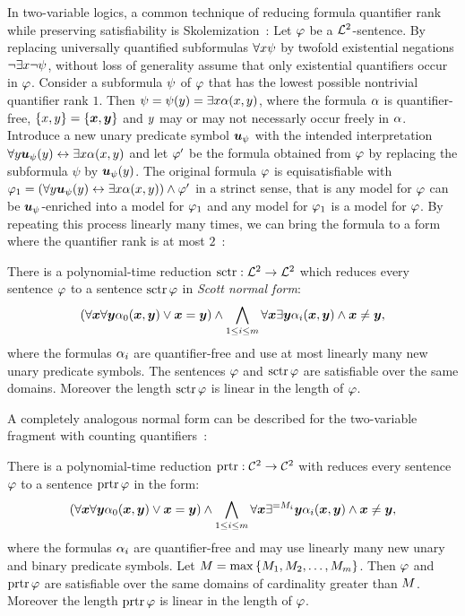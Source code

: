 In two-variable logics, a common technique of reducing formula quantifier rank
while preserving satisfiability is Skolemization~\cite{gradel1999logics}:
Let $\varphi$ be a $\mathcal{L}^{2}$-sentence.
By replacing universally quantified subformulas $\forall x \psi$ by twofold
existential negations $\lnot\exists x \lnot\psi$, without loss of generality
assume that only existential quantifiers occur in $\varphi$.
Consider a subformula $\psi$ of $\varphi$ that has the lowest possible nontrivial
quantifier rank $1$.
Then $\psi = \psi(y) = \exists x \alpha(x,y)$, where the formula
$\alpha$ is quantifier-free, $\left\{x,y\right\} = \left\{\bm{x},\bm{y}\right\}$ and $y$ may
or may not necessarly occur freely in $\alpha$.
Introduce a new unary predicate symbol $\bm{u}_{\psi}$ with the intended
interpretation $\forall y \bm{u}_{\psi}(y) \leftrightarrow \exists x \alpha(x,y)$ and
let ${\varphi'}$ be the formula obtained from $\varphi$ by replacing the subformula
$\psi$ by $\bm{u}_{\psi}(y)$.
The original formula $\varphi$ is equisatisfiable with
$\varphi_1 = (\forall y \bm{u}_{\psi}(y) \leftrightarrow \exists x \alpha(x,y)) \land
{\varphi'}$ in a strinct sense, that is any model for $\varphi$ can be
$\bm{u}_{\psi}$-enriched into a model for $\varphi_1$ and any model for $\varphi_1$ is a
model for $\varphi$.
By repeating this process linearly many times, we can bring the formula to a
form where the quantifier rank is at most 
$2$~\cite{scott1962decision,gradel1999logics}:
\begin{theorem}[Scott]
There is a polynomial-time reduction $\operatorname{sctr}: \mathcal{L}^{2} \to \mathcal{L}^{2}$ which reduces
every sentence $\varphi$ to a sentence $\operatorname{sctr}\varphi$ in \emph{Scott normal form}:
\[
  (\forall\bm{x}\forall\bm{y} \alpha_{0}(\bm{x},\bm{y}) \lor \bm{x} = \bm{y}) \land
  \bigwedge_{1 \leq i \leq m} \forall\bm{x}\exists\bm{y}
  \alpha_{i}(\bm{x},\bm{y}) \land \bm{x} \neq \bm{y},
\]
where the formulas $\alpha_{i}$ are quantifier-free and use at most linearly many
new unary predicate symbols. The sentences $\varphi$ and $\operatorname{sctr}\varphi$ are
satisfiable over the same domains.
Moreover the length $\operatorname{sctr}\varphi$ is linear in the length of $\varphi$.
\end{theorem}

A completely analogous normal form can be described for the two-variable
fragment with counting quantifiers~\cite{MALQ:MALQ201400102}:
\begin{theorem}
There is a polynomial-time reduction $\operatorname{prtr}: \mathcal{C}^{2} \to \mathcal{C}^{2}$ with reduces
every sentence $\varphi$ to a sentence $\operatorname{prtr}\varphi$ in the form:
\[
  (\forall\bm{x}\forall\bm{y} \alpha_{0}(\bm{x},\bm{y}) \lor \bm{x}=\bm{y}) \land
  \bigwedge_{1 \leq i \leq m} \forall\bm{x}\exists^{=M_{i}}\bm{y}
  \alpha_{i}(\bm{x},\bm{y}) \land \bm{x}\neq\bm{y},
\]
where the formulas $\alpha_{i}$ are quantifier-free and may use linearly many new
unary and binary predicate symbols. Let $M = \max\left\{M_{1},M_{2},\dots,M_{m}\right\}$.
Then $\varphi$ and $\operatorname{prtr}\varphi$ are satisfiable over the same domains of
cardinality greater than $M$.
Moreover the length $\operatorname{prtr}\varphi$ is linear in the length of $\varphi$.
\end{theorem}

